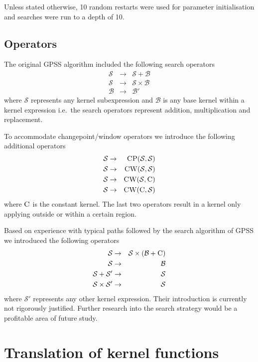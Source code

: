 \documentclass{article}
\def\ie{i.e.\ }
\begin{document}
Unless stated otherwise, 10 random restarts were used for parameter initialisation and searches were run to a depth of 10.

\subsection{Operators}

The original GPSS algorithm included the following search operators
%
\begin{eqnarray}
\mathcal{S} &\to& \mathcal{S} + \mathcal{B} \\
\mathcal{S} &\to& \mathcal{S} \times \mathcal{B} \\
\mathcal{B} &\to& \mathcal{B'}
\end{eqnarray}
%
where $\mathcal{S}$ represents any kernel subexpression and $\mathcal{B}$ is any base kernel within a kernel expression \ie the search operators represent addition, multiplication and replacement.

To accommodate changepoint/window operators we introduce the following additional operators
%
\begin{eqnarray}
\mathcal{S} &\to& {\textsc{CP}}(\mathcal{S},\mathcal{S}) \\
\mathcal{S} &\to& {\textsc{CW}}(\mathcal{S},\mathcal{S}) \\
\mathcal{S} &\to& {\textsc{CW}}(\mathcal{S},{\textsc{C}}) \\
\mathcal{S} &\to& {\textsc{CW}}({\textsc{C}},\mathcal{S})
\end{eqnarray}
%
where ${\textsc{C}}$ is the constant kernel.
The last two operators result in a kernel only applying outside or within a certain region.

Based on experience with typical paths followed by the search algorithm of GPSS we introduced the following operators
%
\begin{eqnarray}
\mathcal{S} &\to& \mathcal{S} \times (\mathcal{B} + {\textsc{C}})\\
\mathcal{S} &\to& \mathcal{B}\\
\mathcal{S} + \mathcal{S'} &\to& \mathcal{S}\\
\mathcal{S} \times \mathcal{S'} &\to& \mathcal{S}
\end{eqnarray}
%
where $\mathcal{S'}$ represents any other kernel expression.
Their introduction is currently not rigorously justified.
Further research into the search strategy would be a profitable area of future study.

\section{Translation of kernel functions}
\end{document}
